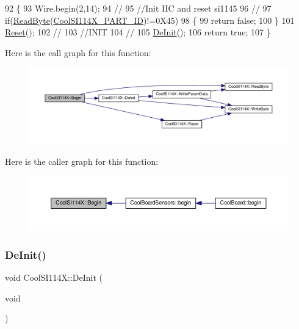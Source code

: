 \begin{DoxyCode}
92 \{
93   Wire.begin(2,14);
94   \textcolor{comment}{//}
95   \textcolor{comment}{//Init IIC  and reset si1145}
96   \textcolor{comment}{//}
97   \textcolor{keywordflow}{if}(\hyperlink{class_cool_s_i114_x_acc20f8037e156ec4aadcbe90780b1e8b}{ReadByte}(\hyperlink{_cool_s_i114_x_8h_a9a3b801001b21652a7cad8b1c94c145c}{CoolSI114X\_PART\_ID})!=0X45)
98   \{
99     \textcolor{keywordflow}{return} \textcolor{keyword}{false};
100   \}
101   \hyperlink{class_cool_s_i114_x_a9d9f9c9129c0c29ed497f8563f3dd823}{Reset}();
102   \textcolor{comment}{//}
103   \textcolor{comment}{//INIT }
104   \textcolor{comment}{//}
105   \hyperlink{class_cool_s_i114_x_a6840abd53a2e3d71a6bb918077c6d6e6}{DeInit}();
106   \textcolor{keywordflow}{return} \textcolor{keyword}{true};
107 \}
\end{DoxyCode}
Here is the call graph for this function\+:\nopagebreak
\begin{figure}[H]
\begin{center}
\leavevmode
\includegraphics[width=350pt]{dd/d67/class_cool_s_i114_x_a206b36aca7049f63be1d11088c30a09f_cgraph}
\end{center}
\end{figure}
Here is the caller graph for this function\+:\nopagebreak
\begin{figure}[H]
\begin{center}
\leavevmode
\includegraphics[width=350pt]{dd/d67/class_cool_s_i114_x_a206b36aca7049f63be1d11088c30a09f_icgraph}
\end{center}
\end{figure}
\mbox{\label{class_cool_s_i114_x_a6840abd53a2e3d71a6bb918077c6d6e6}} 
\subsubsection{\texorpdfstring{De\+Init()}{DeInit()}}
{\footnotesize\ttfamily void Cool\+S\+I114\+X\+::\+De\+Init (\begin{DoxyParamCaption}\item[{void}]{ }\end{DoxyParamCaption})}



